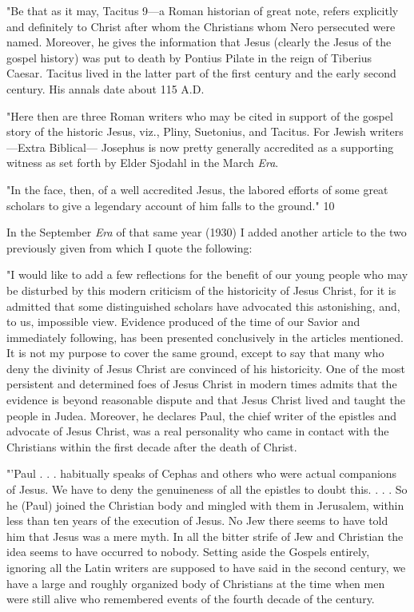 "Be that as it may, Tacitus 9—a Roman historian of great note, refers explicitly and
definitely to Christ after whom the Christians whom Nero persecuted were named. Moreover,
he gives the information that Jesus (clearly the Jesus of the gospel history) was put to death
by Pontius Pilate in the reign of Tiberius Caesar. Tacitus lived in the latter part of the first
century and the early second century. His annals date about 115 A.D.

"Here then are three Roman writers who may be cited in support of the gospel story of the
historic Jesus, viz., Pliny, Suetonius, and Tacitus. For Jewish writers—Extra Biblical—
Josephus is now pretty generally accredited as a supporting witness as set forth by Elder
Sjodahl in the March \textit{Era}.

"In the face, then, of a well accredited Jesus, the labored efforts of some great scholars to
give a legendary account of him falls to the ground." 10

In the September \textit{Era} of that same year (1930) I added another article to the two previously
given from which I quote the following:

"I would like to add a few reflections for the benefit of our young people who may be
disturbed by this modern criticism of the historicity of Jesus Christ, for it is admitted that
some distinguished scholars have advocated this astonishing, and, to us, impossible view.
Evidence produced of the time of our Savior and immediately following, has been presented
conclusively in the articles mentioned. It is not my purpose to cover the same ground, except
to say that many who deny the divinity of Jesus Christ are convinced of his historicity. One
of the most persistent and determined foes of Jesus Christ in modern times admits that the
evidence is beyond reasonable dispute and that Jesus Christ lived and taught the people in
Judea. Moreover, he declares Paul, the chief writer of the epistles and advocate of Jesus
Christ, was a real personality who came in contact with the Christians within the first decade
after the death of Christ.

"'Paul . . . habitually speaks of Cephas and others who were actual companions of Jesus. We
have to deny the genuineness of all the epistles to doubt this. . . . So he (Paul) joined the
Christian body and mingled with them in Jerusalem, within less than ten years of the
execution of Jesus. No Jew there seems to have told him that Jesus was a mere myth. In all
the bitter strife of Jew and Christian the idea seems to have occurred to nobody. Setting aside
the Gospels entirely, ignoring all the Latin writers are supposed to have said in the second
century, we have a large and roughly organized body of Christians at the time when men
were still alive who remembered events of the fourth decade of the century.

